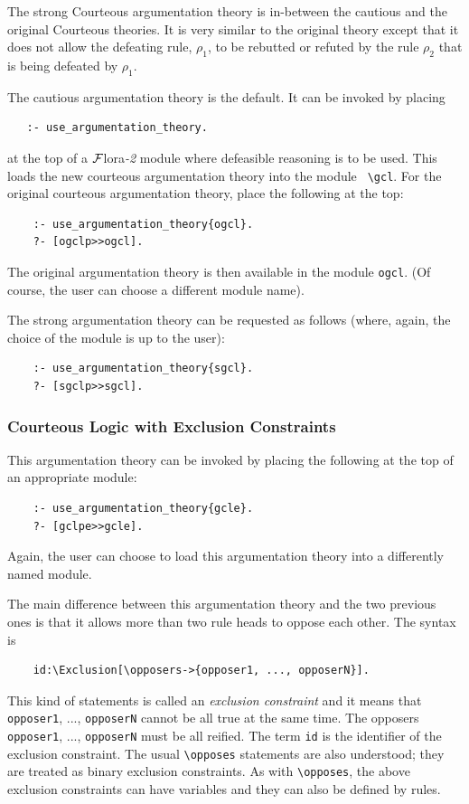 \documentclass[11pt]{article}
\newcommand{\FLORA}{{\mbox{\sc ${\cal F}${lora}\rm\emph{-2}}}\xspace}
\newcommand{\FLSYSTEM}{\FLORA}
\newcommand{\bs}{\textbackslash}
\begin{document}
The strong Courteous argumentation theory is in-between the cautious and
the original Courteous theories. It is very similar to the original theory except that it
does not allow the defeating rule, $\rho_1$, to be rebutted or refuted by the 
rule $\rho_2$ that is being defeated by $\rho_1$.

The cautious argumentation theory is the default. It can be invoked by placing
\begin{verbatim}
   :- use_argumentation_theory.
\end{verbatim}
at the top of a \FLSYSTEM module where defeasible reasoning is to be used.
This loads the new courteous argumentation theory into the module {\tt
  \bs{}gcl}. For the original courteous argumentation theory, place the
following at the top:
\begin{verbatim}
    :- use_argumentation_theory{ogcl}.
    ?- [ogclp>>ogcl].
\end{verbatim}
The original argumentation theory is then available in the module {\tt ogcl}.
(Of course, the user can choose a different module name).

The strong argumentation theory can be requested as follows (where, again,
the choice of the module is up to the user):
\begin{verbatim}
    :- use_argumentation_theory{sgcl}.
    ?- [sgclp>>sgcl].
\end{verbatim}

\subsubsection{Courteous Logic with Exclusion Constraints}

This argumentation theory can be invoked by placing the following at the
top of an appropriate module:
\begin{verbatim}
    :- use_argumentation_theory{gcle}.
    ?- [gclpe>>gcle].
\end{verbatim}
Again, the user can choose to load this argumentation theory into a
differently named module.

The main difference between this argumentation theory and the two previous
ones is that it allows more than two rule heads to oppose each other.
The syntax is
\begin{verbatim}
    id:\Exclusion[\opposers->{opposer1, ..., opposerN}].
\end{verbatim}
This kind of statements is called an \emph{exclusion constraint} and it
means that {\tt opposer1}, ..., {\tt opposerN} cannot be all true    
at the same time. The opposers {\tt opposer1}, ..., {\tt opposerN} must be
all reified. The term {\tt id} is the identifier of the
exclusion constraint.
The usual {\tt \bs{}opposes} statements are also understood; they are
treated as binary exclusion constraints.
As with {\tt \bs{}opposes}, the above exclusion constraints can have variables
and they can also be defined by rules.
\end{document}
